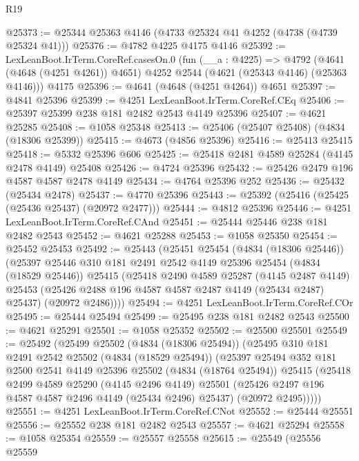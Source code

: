 \begin{lexlean}{R19}
\begin{coremodule}
@25373 := @25344 @25363 @4146 (@4733 @25324 @41 @4252 (@4738 (@4739 @25324 @41)))
@25376 := @4782 @4225 @4175 @4146
@25392 := LexLeanBoot.IrTerm.CoreRef.casesOn.{0}
    (fun (__a : @4225) =>
    @4792 (@4641 (@4648 (@4251 @4261)) @4651) @4252 @2544 (@4621 (@25343 @4146) (@25363 @4146)))
    @4175
@25396 := @4641 (@4648 (@4251 @4264)) @4651
@25397 := @4841 @25396
@25399 := @4251 LexLeanBoot.IrTerm.CoreRef.CEq
@25406 := @25397 @25399 @238 @181 @2482 @2543 @4149 @25396
@25407 := @4621 @25285
@25408 := @1058 @25348
@25413 := @25406 (@25407 @25408) (@4834 (@18306 @25399))
@25415 := @4673 (@4856 @25396)
@25416 := @25413 @25415
@25418 := @5332 @25396 @606
@25425 := @25418 @2481 @4589 @25284 (@4145 @2478 @4149) @25408
@25426 := @4724 @25396
@25432 := @25426 @2479 @196 @4587 @4587 @2478 @4149
@25434 := @4764 @25396 @252
@25436 := @25432 (@25434 @2478)
@25437 := @4770 @25396
@25443 := @25392 (@25416 (@25425 (@25436 @25437) (@20972 @2477)))
@25444 := @4812 @25396
@25446 := @4251 LexLeanBoot.IrTerm.CoreRef.CAnd
@25451 := @25444 @25446 @238 @181 @2482 @2543
@25452 := @4621 @25288
@25453 := @1058 @25350
@25454 := @25452 @25453
@25492 := @25443
    (@25451
      @25454
      (@4834 (@18306 @25446))
      (@25397
        @25446
        @310
        @181
        @2491
        @2542
        @4149
        @25396
        @25454
        (@4834 (@18529 @25446))
        @25415
        (@25418
          @2490
          @4589
          @25287
          (@4145 @2487 @4149)
          @25453
          (@25426 @2488 @196 @4587 @4587 @2487 @4149 (@25434 @2487) @25437)
          (@20972 @2486))))
@25494 := @4251 LexLeanBoot.IrTerm.CoreRef.COr
@25495 := @25444 @25494
@25499 := @25495 @238 @181 @2482 @2543
@25500 := @4621 @25291
@25501 := @1058 @25352
@25502 := @25500 @25501
@25549 := @25492
    (@25499
      @25502
      (@4834 (@18306 @25494))
      (@25495
        @310
        @181
        @2491
        @2542
        @25502
        (@4834 (@18529 @25494))
        (@25397
          @25494
          @352
          @181
          @2500
          @2541
          @4149
          @25396
          @25502
          (@4834 (@18764 @25494))
          @25415
          (@25418
            @2499
            @4589
            @25290
            (@4145 @2496 @4149)
            @25501
            (@25426 @2497 @196 @4587 @4587 @2496 @4149 (@25434 @2496) @25437)
            (@20972 @2495)))))
@25551 := @4251 LexLeanBoot.IrTerm.CoreRef.CNot
@25552 := @25444 @25551
@25556 := @25552 @238 @181 @2482 @2543
@25557 := @4621 @25294
@25558 := @1058 @25354
@25559 := @25557 @25558
@25615 := @25549
    (@25556
      @25559

\end{coremodule}
\end{lexlean}
